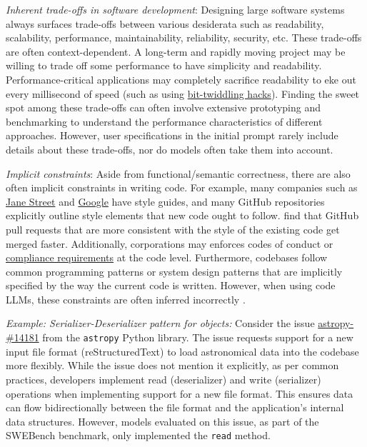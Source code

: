 \textit{Inherent trade-offs in software development}: Designing large software systems always surfaces trade-offs between various desiderata such as readability, scalability, performance, maintainability, reliability, security, etc. These trade-offs are often context-dependent. A long-term and rapidly moving project may be willing to trade off some performance to have simplicity and readability. Performance-critical applications may completely sacrifice readability to eke out every millisecond of speed 
(such as using \href{https://graphics.stanford.edu/~seander/bithacks.html}{bit-twiddling hacks}).
Finding the sweet spot among these trade-offs can often involve extensive prototyping and benchmarking to understand the performance characteristics of different approaches. However, user specifications in the initial prompt rarely include details about these trade-offs, nor do models often take them into account.

\textit{Implicit constraints}: Aside from functional/semantic correctness, there are also often implicit constraints in writing code. For example, many companies such as \href{https://opensource.janestreet.com/standards/}{Jane Street} and \href{https://google.github.io/styleguide/}{Google} have style guides, and many GitHub repositories explicitly outline style elements that new code ought to follow. \cite{zou2019does} find that GitHub pull requests that are more consistent with the style of the existing code get merged faster. Additionally, corporations may enforces codes of conduct or \href{https://developers.google.com/checks/guide/code-compliance/overview}{compliance requirements} at the code level. Furthermore, codebases follow common programming patterns or system design patterns that are implicitly specified by the way the current code is written. However, when using code LLMs, these constraints are often inferred incorrectly \citep{wang2024beyond}.

\begin{tcolorbox}[colback=lightblue, boxrule=0pt, arc=5pt, outer arc=5pt, after skip=10pt plus 2pt]
\textit{Example: Serializer-Deserializer pattern for objects:} Consider the issue \href{https://github.com/astropy/astropy/issues/14181}{astropy-\#14181} from the \texttt{astropy} Python library. The issue requests support for a new input file format (reStructuredText) to load astronomical data into the codebase more flexibly. While the issue does not mention it explicitly, as per common practices, developers implement read (deserializer) and write (serializer) operations when implementing support for a new file format. This ensures data can flow bidirectionally between the file format and the application's internal data structures. However, models evaluated on this issue, as part of the SWEBench benchmark, only implemented the \texttt{read} method.
\end{tcolorbox}

